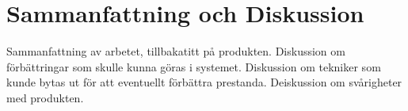 \section{Sammanfattning och Diskussion}

Sammanfattning av arbetet, tillbakatitt på produkten. Diskussion om förbättringar som skulle kunna göras i systemet. Diskussion om tekniker som kunde bytas ut för att eventuellt förbättra prestanda. Deiskussion om svårigheter med produkten.

